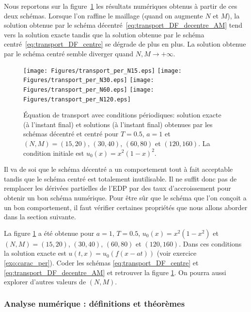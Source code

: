 \documentclass[12pt,a4paper,twoside]{article}
\begin{document}
Nous reportons sur la figure~\ref{fig:trans_per} 
les r\'esultats num\'eriques obtenus \`a partir de ces deux sch\'emas.
Lorsque l'on raffine le maillage (quand on augmente $N$ et $M$),
la solution obtenue par le sch\'ema d\'ecentr\'e~\eqref{eq:transport_DF_decentre_AM}
tend vers la solution exacte
tandis que la solution obtenue par le sch\'ema centr\'e~\eqref{eq:transport_DF_centre}
se d\'egrade de plus en plus. La solution obtenue par le sch\'ema centr\'e semble
diverger quand $N, M \to +\infty$.

\begin{figure}[h]
  \centering
  \texttt{[image: Figures/transport\_per\_N15.eps]}
  \texttt{[image: Figures/transport\_per\_N30.eps]}
  \texttt{[image: Figures/transport\_per\_N60.eps]}
  \texttt{[image: Figures/transport\_per\_N120.eps]}
  \caption{\'Equation de transport avec conditions p\'eriodiques: solution exacte (\`a 
    l'instant final) et
    solutions (\`a l'instant final) 
    obtenues par les sch\'emas d\'ecentr\'e et centr\'e pour $T=0.5$, $a=1$ et
    $(N,M) = (15,20)$, $(30,40)$, $(60,80)$ et $(120,160)$.
    La condition initiale est $u_0(x) = x^2(1-x)^2$.}
  \label{fig:trans_per}
\end{figure}


Il va de soi que le sch\'ema d\'ecentr\'e a un comportement tout \`a fait acceptable
tandis que le sch\'ema centr\'e est totalement inutilisable.
Il ne suffit donc pas de remplacer les d\'eriv\'ees
partielles de l'EDP par des taux d'accroissement pour obtenir un bon sch\'ema num\'erique.
Pour \^etre s\^ur que le sch\'ema que l'on con\c{c}oit a un bon comportement,
il faut v\'erifier certaines propri\'et\'es que nous allons aborder dans la section suivante.


\begin{exercise}
  La figure \ref{fig:trans_per} a \'et\'e obtenue pour $a=1$, $T=0.5$, $u_0(x) = x^2(1-x^2)$
  et $(N,M) = (15,20)$, $(30,40)$, $(60,80)$ et $(120,160)$.
  Dans ces conditions la solution exacte est $u(t,x) = u_0(f(x-at))$
  (voir exercice \ref{exo:carac_per}).
  Coder les sch\'emas \eqref{eq:transport_DF_centre} et \eqref{eq:transport_DF_decentre_AM}
  et retrouver la figure \ref{fig:trans_per}.
  On pourra aussi explorer d'autres valeurs de $(N,M)$.
\end{exercise}

\subsubsection{Analyse num\'erique : d\'efinitions et th\'eor\`emes}
\label{subsubsec:analyse_def}
\end{document}
